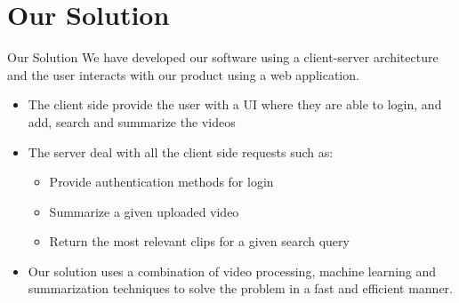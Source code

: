 \documentclass{beamer}
\begin{document}
\section{Our Solution}
\begin{frame}{Our Solution}
    We have developed our software using a client-server architecture and the user interacts with our product using a web application.
    \begin{itemize}
        \item The client side provide the user with a UI where they are able to login, and add, search and summarize the videos
        \item The server deal with all the client side requests such as:
            \begin{itemize}
                \item Provide authentication methods for login
                \item Summarize a given uploaded video
                \item Return the most relevant clips for a given search query
            \end{itemize}
        \item Our solution uses a combination of video processing, machine learning and summarization techniques to solve the problem in a fast and efficient manner. 
    \end{itemize}
\end{frame}
\end{document}
